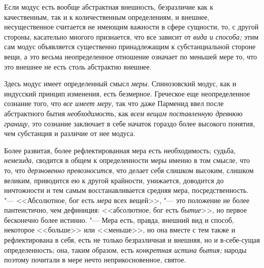 Если модус есть вообще абстрактная внешность, безразличие как к
качественным, так и к количественным определениям, и внешнее,
несущественное считается не имеющим важности в сфере сущности, то, с другой
стороны, касательно многого признается, что все зависит от
{\em вида и способа;} этим сам модус объявляется
существенно принадлежащим к субстанциальной стороне вещи, а это весьма
неопределенное отношение означает по меньшей мере то, что это внешнее не
есть столь абстрактно внешнее.

Здесь модус имеет определенный смысл {\em меры}.
Спинозовский модус, как и индусский принцип изменения, есть безмерное.
Греческое еще неопределенное сознание того, что
{\em все имеет меру}, так что даже Парменид ввел после
абстрактного бытия {\em необходимость}, как
{\em всем вещам поставленную древнюю границу}, это
сознание заключает в себе начаток гораздо более высокого понятия, чем
субстанция и различие от нее модуса.

Более развитая, более рефлектированная мера есть необходимость; судьба,
{\em немезида}, сводится в общем к определенности меры
именно в том смысле, что то, что {\em дерзновенно
превозносится}, что делает себя слишком высоким, слишком великим,
приводится ею к другой крайности, унижается, доводится до ничтожности и тем
самым восстанавливается средняя мера, посредственность. "--- <<Абсолютное, бог
есть {\em мера} всех вещей>>, "--- это положение не более
пантеистично, чем дефиниция: <<абсолютное, бог есть
{\em бытие}>>, но первое бесконечно более истинно. "---
Мера есть, правда, внешний вид и способ, некоторое <<больше>> или <<меньше>>,
но она вместе с тем также и рефлектирована в себя, есть не только
безразличная и внешняя, но и в-себе-сущая определенность; она, таким
образом, есть {\em конкретная истина бытия;} народы
поэтому почитали в мере нечто неприкосновенное, святое.

